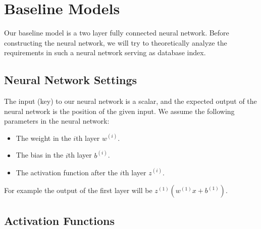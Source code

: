 \section{Baseline Models}

Our baseline model is a two layer fully connected neural network. Before
constructing the neural network, we will try to theoretically analyze
the requirements in such a neural network serving as database index.


\subsection{Neural Network Settings}

The input (key) to our neural network is a scalar, and the expected
output of the neural network is the position of the given input. We
assume the following parameters in the neural network:

\begin{itemize}
\item
  The weight in the \(i\)th layer \(w^{(i)}\).
\item
  The bias in the \(i\)th layer \(b^{(i)}\).
\item
  The activation function after the \(i\)th layer \(z^{(i)}\).
\end{itemize}

For example the output of the first layer will be
\(z^{(1)}(w^{(1)}x+b^{(1)})\).


\subsection{Activation Functions}

